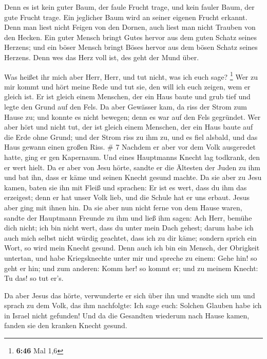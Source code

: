  Denn es ist kein guter Baum, der faule Frucht trage, und
kein fauler Baum, der gute Frucht trage.  Ein jeglicher
Baum wird an seiner eigenen Frucht erkannt. Denn man liest nicht Feigen
von den Dornen, auch liest man nicht Trauben von den Hecken.
 Ein guter Mensch bringt Gutes hervor aus dem guten Schatz
seines Herzens; und ein böser Mensch bringt Böses hervor aus dem bösen
Schatz seines Herzens. Denn wes das Herz voll ist, des geht der Mund
über.

 Was heißet ihr mich aber Herr, Herr, und tut nicht, was
ich euch sage? \footnote{\textbf{6:46} Mal 1,6}  Wer zu mir
kommt und hört meine Rede und tut sie, den will ich euch zeigen, wem er
gleich ist.  Er ist gleich einem Menschen, der ein Haus
baute und grub tief und legte den Grund auf den Fels. Da aber Gewässer
kam, da riss der Strom zum Hause zu; und konnte es nicht bewegen; denn
es war auf den Fels gegründet.  Wer aber hört und nicht
tut, der ist gleich einem Menschen, der ein Haus baute auf die Erde ohne
Grund; und der Strom riss zu ihm zu, und es fiel alsbald, und das Haus
gewann einen großen Riss. \# 7  Nachdem er aber vor dem Volk
ausgeredet hatte, ging er gen Kapernaum.  Und eines
Hauptmanns Knecht lag todkrank, den er wert hielt.  Da er
aber von Jesu hörte, sandte er die Ältesten der Juden zu ihm und bat
ihn, dass er käme und seinen Knecht gesund machte.  Da sie
aber zu Jesu kamen, baten sie ihn mit Fleiß und sprachen: Er ist es
wert, dass du ihm das erzeigest;  denn er hat unser Volk
lieb, und die Schule hat er uns erbaut.  Jesus aber ging mit
ihnen hin. Da sie aber nun nicht ferne von dem Hause waren, sandte der
Hauptmann Freunde zu ihm und ließ ihm sagen: Ach Herr, bemühe dich
nicht; ich bin nicht wert, dass du unter mein Dach gehest; 
darum habe ich auch mich selbst nicht würdig geachtet, dass ich zu dir
käme; sondern sprich ein Wort, so wird mein Knecht gesund. 
Denn auch ich bin ein Mensch, der Obrigkeit untertan, und habe
Kriegsknechte unter mir und spreche zu einem: Gehe hin! so geht er hin;
und zum anderen: Komm her! so kommt er; und zu meinem Knecht: Tu das! so
tut er's.

 Da aber Jesus das hörte, verwunderte er sich über ihn und
wandte sich um und sprach zu dem Volk, das ihm nachfolgte: Ich sage
euch: Solchen Glauben habe ich in Israel nicht gefunden! 
Und da die Gesandten wiederum nach Hause kamen, fanden sie den kranken
Knecht gesund.

